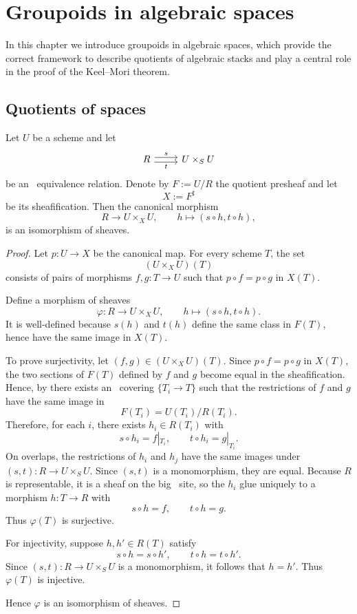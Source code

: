\chapter{Groupoids in algebraic spaces}

In this chapter we introduce groupoids in algebraic spaces, which provide the
correct framework to describe quotients of algebraic stacks and play a central
role in the proof of the Keel--Mori theorem.

\section{Quotients of spaces}

\begin{proposition}
	Let $U$ be a scheme and let
	\[\begin{tikzcd}
		R & {U\times_S U}
		\arrow["t"', shift right, from=1-1, to=1-2]
		\arrow["s", shift left, from=1-1, to=1-2]
	\end{tikzcd}\]
	be an \etale\ equivalence relation. Denote by $F:=U/R$ the quotient presheaf and let
	\[
	X:=F^\sharp
	\]
	be its sheafification. Then the canonical morphism
	\[
	R \to U\times_X U,\qquad h\mapsto (s\circ h,t\circ h),
	\]
	is an isomorphism of sheaves.
\end{proposition}

\begin{proof}
	Let $p:U\to X$ be the canonical map. For every scheme $T$, the set
	\[
	(U\times_XU)(T)
	\]
	consists of pairs of morphisms $f,g:T\to U$ such that $p\circ f=p\circ g$ in $X(T)$.
	
	Define a morphism of sheaves
	\[
	\varphi:R\to U\times_XU,\qquad h\mapsto (s\circ h,t\circ h).
	\]
	It is well-defined because $s(h)$ and $t(h)$ define the same class in $F(T)$, hence have the same image in $X(T)$.
	
	To prove surjectivity, let $(f,g)\in (U\times_XU)(T)$. Since $p\circ f=p\circ g$ in $X(T)$, the two sections of $F(T)$ defined by $f$ and $g$ become equal in the sheafification. Hence, by \cite[][Tag 00WK]{stacks-project} there exists an \etale\ covering $\{T_i\to T\}$ such that the restrictions of $f$ and $g$ have the same image in
	\[
	F(T_i)=U(T_i)/R(T_i).
	\]
	Therefore, for each $i$, there exists $h_i\in R(T_i)$ with
	\[
	s\circ h_i=f|_{T_i},\qquad t\circ h_i=g|_{T_i}.
	\]
	On overlaps, the restrictions of $h_i$ and $h_j$ have the same images under $(s,t):R\to U\times_SU$. Since $(s,t)$ is a monomorphism, they are equal. Because $R$ is representable, it is a sheaf on the big \etale\ site, so the $h_i$ glue uniquely to a morphism $h:T\to R$ with
	\[
	s\circ h=f,\qquad t\circ h=g.
	\]
	Thus $\varphi(T)$ is surjective.
	
	For injectivity, suppose $h,h'\in R(T)$ satisfy
	\[
	s\circ h=s\circ h',\qquad t\circ h=t\circ h'.
	\]
	Since $(s,t):R\to U\times_SU$ is a monomorphism, it follows that $h=h'$. Thus $\varphi(T)$ is injective.
	
	Hence $\varphi$ is an isomorphism of sheaves.
\end{proof}

